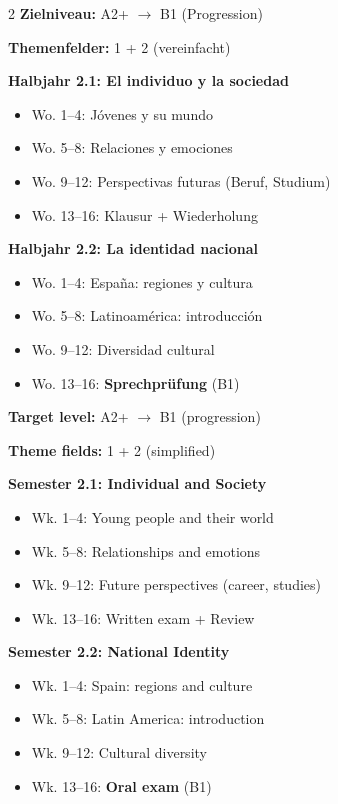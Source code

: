 \documentclass[10pt,a4paper]{article}
\begin{document}
\begin{paracol}{2}
\small
\textbf{Zielniveau:} A2+ $\rightarrow$ B1 (Progression)\footnotemark[6]
\par\vspace{1mm}
\textbf{Themenfelder:} 1 + 2 (vereinfacht)

\textbf{Halbjahr 2.1: El individuo y la sociedad}
\begin{itemize}[noitemsep,topsep=2pt]
\item Wo. 1--4: Jóvenes y su mundo
\item Wo. 5--8: Relaciones y emociones
\item Wo. 9--12: Perspectivas futuras (Beruf, Studium)
\item Wo. 13--16: Klausur + Wiederholung
\end{itemize}

\textbf{Halbjahr 2.2: La identidad nacional}
\begin{itemize}[noitemsep,topsep=2pt]
\item Wo. 1--4: España: regiones y cultura
\item Wo. 5--8: Latinoamérica: introducción
\item Wo. 9--12: Diversidad cultural
\item Wo. 13--16: \textbf{Sprechprüfung} (B1)
\end{itemize}

\switchcolumn

\small\color{english}
\textbf{Target level:} A2+ $\rightarrow$ B1 (progression)\footnotemark[6]
\par\vspace{1mm}
\textbf{Theme fields:} 1 + 2 (simplified)

\textbf{Semester 2.1: Individual and Society}
\begin{itemize}[noitemsep,topsep=2pt]
\item Wk. 1--4: Young people and their world
\item Wk. 5--8: Relationships and emotions
\item Wk. 9--12: Future perspectives (career, studies)
\item Wk. 13--16: Written exam + Review
\end{itemize}

\textbf{Semester 2.2: National Identity}
\begin{itemize}[noitemsep,topsep=2pt]
\item Wk. 1--4: Spain: regions and culture
\item Wk. 5--8: Latin America: introduction
\item Wk. 9--12: Cultural diversity
\item Wk. 13--16: \textbf{Oral exam} (B1)
\end{itemize}

\end{paracol}
\end{document}
